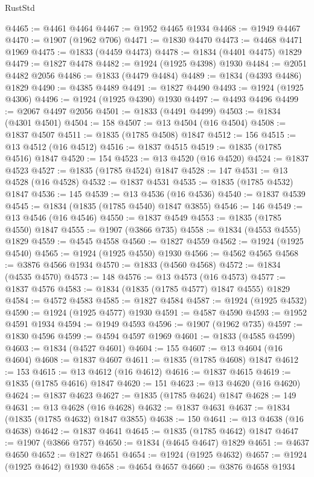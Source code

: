 \begin{lexlean}{RustStd}
\begin{coremodule}
{\begin{coremodule}
{{{{{@4465 := @4461 @4464
@4467 := @1952 @4465 @1934
@4468 := @1949 @4467
@4470 := @1907 (@1962 @706)
@4471 := @1830 @4470
@4473 := @4468 @4471 @1969
@4475 := @1833 (@4459 @4473)
@4478 := @1834 (@4401 @4475) @1829
@4479 := @1827 @4478
@4482 := @1924 (@1925 @4398) @1930
@4484 := @2051 @4482 @2056
@4486 := @1833 (@4479 @4484)
@4489 := @1834 (@4393 @4486) @1829
@4490 := @4385 @4489
@4491 := @1827 @4490
@4493 := @1924 (@1925 @4306)
@4496 := @1924 (@1925 @4390) @1930
@4497 := @4493 @4496
@4499 := @2067 @4497 @2056
@4501 := @1833 (@4491 @4499)
@4503 := @1834 (@4301 @4501)
@4504 := 158
@4507 := @13 @4504 (@16 @4504)
@4508 := @1837 @4507
@4511 := @1835 (@1785 @4508) @1847
@4512 := 156
@4515 := @13 @4512 (@16 @4512)
@4516 := @1837 @4515
@4519 := @1835 (@1785 @4516) @1847
@4520 := 154
@4523 := @13 @4520 (@16 @4520)
@4524 := @1837 @4523
@4527 := @1835 (@1785 @4524) @1847
@4528 := 147
@4531 := @13 @4528 (@16 @4528)
@4532 := @1837 @4531
@4535 := @1835 (@1785 @4532) @1847
@4536 := 145
@4539 := @13 @4536 (@16 @4536)
@4540 := @1837 @4539
@4545 := @1834 (@1835 (@1785 @4540) @1847 @3855)
@4546 := 146
@4549 := @13 @4546 (@16 @4546)
@4550 := @1837 @4549
@4553 := @1835 (@1785 @4550) @1847
@4555 := @1907 (@3866 @735)
@4558 := @1834 (@4553 @4555) @1829
@4559 := @4545 @4558
@4560 := @1827 @4559
@4562 := @1924 (@1925 @4540)
@4565 := @1924 (@1925 @4550) @1930
@4566 := @4562 @4565
@4568 := @3876 @4566 @1934
@4570 := @1833 (@4560 @4568)
@4572 := @1834 (@4535 @4570)
@4573 := 148
@4576 := @13 @4573 (@16 @4573)
@4577 := @1837 @4576
@4583 := @1834 (@1835 (@1785 @4577) @1847 @4555) @1829
@4584 := @4572 @4583
@4585 := @1827 @4584
@4587 := @1924 (@1925 @4532)
@4590 := @1924 (@1925 @4577) @1930
@4591 := @4587 @4590
@4593 := @1952 @4591 @1934
@4594 := @1949 @4593
@4596 := @1907 (@1962 @735)
@4597 := @1830 @4596
@4599 := @4594 @4597 @1969
@4601 := @1833 (@4585 @4599)
@4603 := @1834 (@4527 @4601)
@4604 := 155
@4607 := @13 @4604 (@16 @4604)
@4608 := @1837 @4607
@4611 := @1835 (@1785 @4608) @1847
@4612 := 153
@4615 := @13 @4612 (@16 @4612)
@4616 := @1837 @4615
@4619 := @1835 (@1785 @4616) @1847
@4620 := 151
@4623 := @13 @4620 (@16 @4620)
@4624 := @1837 @4623
@4627 := @1835 (@1785 @4624) @1847
@4628 := 149
@4631 := @13 @4628 (@16 @4628)
@4632 := @1837 @4631
@4637 := @1834 (@1835 (@1785 @4632) @1847 @3855)
@4638 := 150
@4641 := @13 @4638 (@16 @4638)
@4642 := @1837 @4641
@4645 := @1835 (@1785 @4642) @1847
@4647 := @1907 (@3866 @757)
@4650 := @1834 (@4645 @4647) @1829
@4651 := @4637 @4650
@4652 := @1827 @4651
@4654 := @1924 (@1925 @4632)
@4657 := @1924 (@1925 @4642) @1930
@4658 := @4654 @4657
@4660 := @3876 @4658 @1934
}}}}}
\end{coremodule}}
\end{coremodule}
\end{lexlean}
